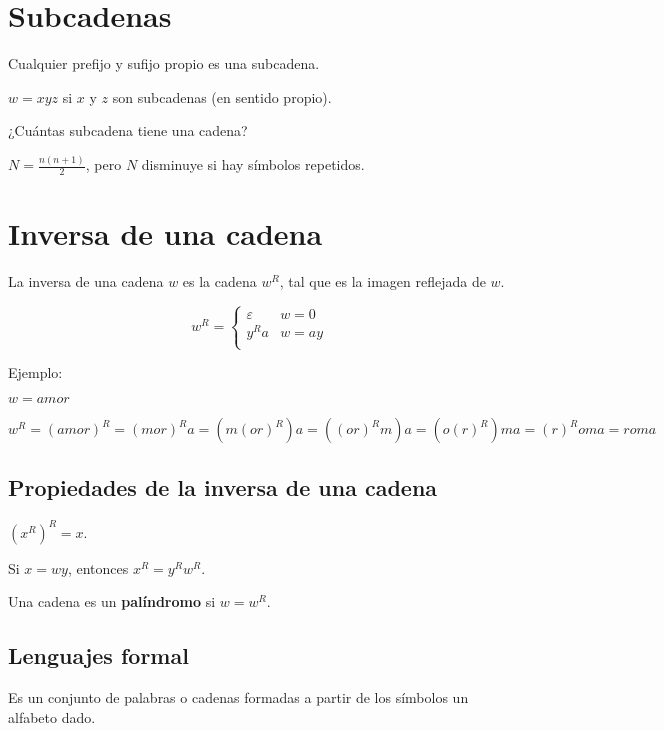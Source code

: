 \documentclass{article}
\begin{document}
\section{Subcadenas}

Cualquier prefijo y sufijo propio es una subcadena.

$w = xyz$ si $x$ y $z$ son subcadenas (en sentido propio).

¿Cuántas subcadena tiene una cadena?
\vspace{1em}

$N = \frac{n(n+1)}{2}$, pero $N$ disminuye si hay símbolos repetidos.

\section{Inversa de una cadena}

La inversa de una cadena $w$ es la cadena $w^R$, tal que es la imagen reflejada
de $w$.

\begin{equation*}
    w^R = \begin{cases}
    \varepsilon & w = 0\\
    y^{R}a & w = ay\\
    \end{cases}
\end{equation*}

Ejemplo:
\vspace{1em}

$w = amor$

$w^R = (amor) ^R = (mor)^{R}a = (m(or)^R)a = ((or)^{R}m)a = (o(r)^{R})ma = (r)^R oma
= roma$

\subsection{Propiedades de la inversa de una cadena}

$(x^R)^R = x$.
\vspace{1em}

Si $x = wy$, entonces $x^R = y^Rw^R$.
\vspace{1em}

Una cadena es un \textbf{palíndromo} si $w = w^R$.
\vspace{1em}

\subsection{Lenguajes formal}

Es un conjunto de palabras o cadenas formadas a partir de los símbolos  un
alfabeto dado.
\end{document}
